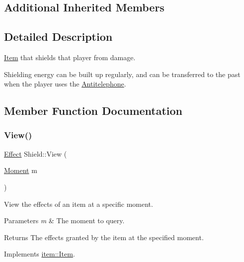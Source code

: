 \subsection*{Additional Inherited Members}


\subsection{Detailed Description}
\hyperlink{classitem_1_1_item}{Item} that shields that player from damage. 

Shielding energy can be built up regularly, and can be transferred to the past when the player uses the \hyperlink{classitem_1_1_antitelephone}{Antitelephone}. 

\subsection{Member Function Documentation}
\mbox{\label{classitem_1_1_shield_abdc88bd6d0a4d6021805fa3097f47633}} 
\subsubsection{\texorpdfstring{View()}{View()}}
{\footnotesize\ttfamily \hyperlink{classitem_1_1_effect}{Effect} Shield\+::\+View (\begin{DoxyParamCaption}\item[{\hyperlink{classtimeplane_1_1_moment}{Moment}}]{m }\end{DoxyParamCaption})\hspace{0.3cm}{\ttfamily [virtual]}}



View the effects of an item at a specific moment. 


\begin{DoxyParams}{Parameters}
{\em m} & The moment to query. \\
\hline
\end{DoxyParams}
\begin{DoxyReturn}{Returns}
The effects granted by the item at the specified moment. 
\end{DoxyReturn}


Implements \hyperlink{classitem_1_1_item_a400dfeabc4056d36bfd348ff9c51cf7d}{item\+::\+Item}.

\mbox{\label{classitem_1_1_shield_a91b92d4e1fca7015b75142d43f43e80e}} 
